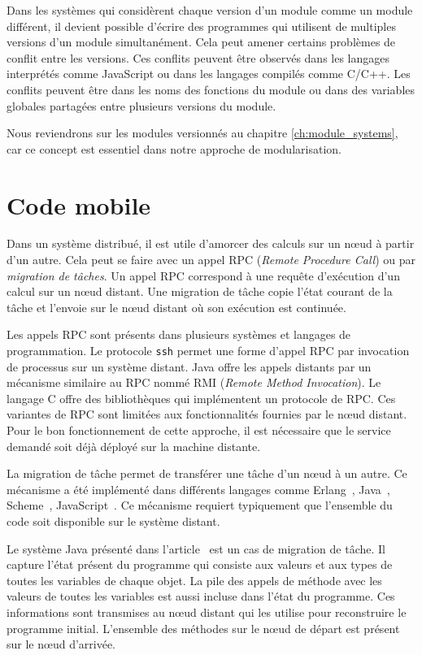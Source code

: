 Dans les systèmes qui considèrent chaque version d'un module comme un
module différent, il devient possible d'écrire des programmes qui
utilisent de multiples versions d'un module simultanément. Cela peut
amener certains problèmes de conflit entre les versions. Ces conflits
peuvent être observés dans les langages interprétés comme JavaScript
ou dans les langages compilés comme C/C++. Les conflits peuvent être
dans les noms des fonctions du module ou dans des variables globales
partagées entre plusieurs versions du module.

Nous reviendrons sur les modules versionnés au chapitre
\ref{ch:module_systems}, car ce concept est essentiel dans
notre approche de modularisation.

\section{Code mobile}

Dans un système distribué, il est utile d'amorcer des calculs sur un
nœud à partir d'un autre.
Cela peut se faire avec un appel RPC (\textit{Remote
Procedure Call}) ou par \textit{migration de tâches}.  Un appel RPC correspond
à une requête d'exécution d'un calcul sur un nœud distant. Une migration de
tâche copie l'état courant de la tâche et l'envoie sur le nœud distant où son
exécution est continuée.

Les appels RPC sont présents dans plusieurs systèmes et langages de
programmation.  Le protocole \texttt{ssh} permet une forme d'appel RPC par
invocation de processus sur un système distant. Java offre les appels distants par un
mécanisme similaire au RPC nommé RMI (\textit{Remote Method Invocation}).
Le langage C offre des bibliothèques qui implémentent un protocole de RPC.
Ces variantes de RPC sont limitées aux fonctionnalités fournies par le nœud distant.
Pour le bon fonctionnement de cette approche, il est nécessaire que le
service demandé soit déjà déployé sur la machine distante.

La migration de tâche permet de transférer une tâche d'un nœud à un autre.  Ce
mécanisme a été implémenté dans différents langages comme
Erlang~\cite{M_mobileintelligent}, Java~\cite{And98transparentmigration},
Scheme~\cite{Sumii00animplementation}\cite{DBLP:conf/erlang/Germain06},
JavaScript~\cite{DEV2017transparentmigration}. Ce mécanisme requiert
typiquement que l'ensemble du code soit disponible sur le système distant.

Le système Java présenté dans l'article~\cite{And98transparentmigration} est un
cas de migration de tâche. Il capture l'état présent du programme qui consiste
aux valeurs et aux types de toutes les variables de chaque objet. La pile des
appels de méthode avec les valeurs de toutes les
variables est aussi incluse dans l'état du programme.
Ces informations sont transmises au nœud distant qui les utilise pour reconstruire le programme initial.
L'ensemble des méthodes sur le nœud de départ est présent sur le
nœud d'arrivée.

